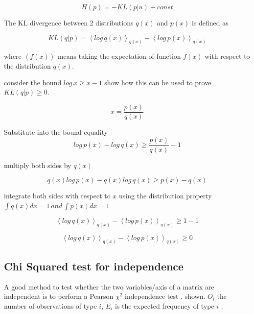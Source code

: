 \begin{equation}
H(p)=-KL(p|u)+const
\label{eq:kl}
\end{equation}

 The KL divergence between 2 distributions $q(x)$ and $p(x)$ is defined as

\begin{equation}
    KL(q|p)= \left \langle log\, q(x) \right \rangle_{q(x)}-\left \langle log\, p(x) \right \rangle_{q(x)}
\label{eq:klproofstart}
\end{equation}

where $\left \langle f(x) \right \rangle$ means taking the expectation of function $f(x)$ with respect to the distribution $q(x)$.

consider the bound $log\, x \geq x-1$ show how this can be used to prove $KL(q|p)\geq0$.

\begin{equation}
    x = \frac{p(x)}{q(x)}
\end{equation}

Substitute into the bound equality
\begin{equation}
   log\,p(x)-log\,q(x) \geq \frac{p(x)}{q(x)}-1 
\end{equation}

multiply both sides by $q(x)$

\begin{equation}
    q(x)log\,p(x)-q(x)log\,q(x) \geq p(x)-q(x) 
\end{equation}

integrate both sides with respect to $x$ using the distribution property $\int q(x)dx=1 \,and \,\int p(x)dx=1 $

\begin{equation}
    \left \langle log\, q(x) \right \rangle_{q(x)}-\left \langle log\, p(x) \right \rangle_{q(x)} \geq 1-1
\end{equation}


\begin{equation}
    \left \langle log\, q(x) \right \rangle_{q(x)}-\left \langle log\, p(x) \right \rangle_{q(x)} \geq 0
\label{eq:klproofend}
\end{equation}

\subsection{Chi Squared test for independence}
A good method to test whether the two variables/axis of a  matrix are independent is to perform a Pearson $\chi^2$ independence test \cite{pearson1900}, shown. $O_i$ the number of observations of type $i$, $E_i$ is the expected frequency of type $i$ \cite{pearsonschisquaredtest2016}.

